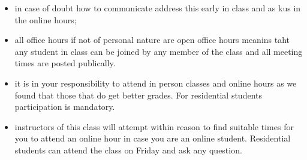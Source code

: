 \begin{itemize}

\item in case of doubt how to communicate address this early in class
  and as kus in the online hours;

\item all office hours if not of personal nature are open office hours
  meanins taht any student in class can be joined by any member of the
  class and  all meeting times are posted publically.

\item it is in your responsibility to attend in person classes and
  online hours as we found that those that do get better grades. For
  residential students participation is mandatory.

\item instructors of this class will attempt within reason to find
  suitable times for you to attend an online hour in case you are an
  online student. Residential students can attend the class on Friday
  and ask any question. 

\end{itemize}